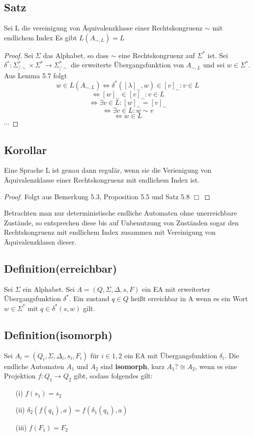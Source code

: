 \subsection{Satz} Sei L die vereinigung von Äquivalenzklasse einer Rechtskongruenz $\sim$ mit endlichem Index Es gibt $L(A_{\sim, L}) = L$ 
\begin{proof}
  Sei $\Sigma$ das Alphabet, so dass $\sim$ eine Rechtskongruenz auf $\Sigma^{*}$ ist. Sei $\delta^{*} : \Sigma^{*}_{/\sim} \times \Sigma^{*} \rightarrow \Sigma^{*}_{/\sim}$ die erweiterte Übergangsfunktion von $A_{\sim, L}$ und sei $w \in \Sigma^{*}$. Aus Lemma 5.7 folgt 
  \[w \in L(A_{\sim, L}) \Leftrightarrow \delta^{*}([\lambda]_{\sim}, w) \in {[v]_{\sim} : v \in L}\]
  \[\Leftrightarrow [w]_{\sim} \in {[v]_{\sim} : v\in L}\]
  \[\Leftrightarrow \exists v \in L : [w]_{\sim} = [v]_{\sim}\]
  \[\Leftrightarrow \exists v \in L : w \sim v\]
  \[\Leftrightarrow w \in L\]
  $\cdots$    
\end{proof}

\subsection{Korollar} Eine Sprache L ist genau dann regulär, wenn sie die Verienigung von Äquivalenzklasse einer Rechtskongruenz mit endlichem Index ist. 
\begin{proof}
  Folgt aus Bemerkung 5.3, Proposition 5.5 und Satz 5.8 $\Box$ 
\end{proof}
Betrachten man nur deterministische endliche Automaten ohne unerreichbare Zustände, so entsprechen diese bis auf Unbenutzung von Zuständen sogar den Rechtskongruenz mit endlichem Index zusammen mit Vereinigung von Äquivalenzklassn dieser.

\subsection{Definition(erreichbar)} Sei $\Sigma$ ein Alphabet. Sei $A = (Q, \Sigma, \Delta, s, F)$ ein EA mit erweiterter Übergangsfunktion $\delta^{*}$. Ein zustand $q\in Q$ heißt erreichbar in A wenn es ein Wort $w \in \Sigma ^{*}$ mit $q\in \delta^{*}(s, w)$ gilt.

\subsection{Definition(isomorph)} Sei $A_{i} = (Q_{i}, \Sigma, \Delta_{i}, s_{i}, F_{i})$ für $i \in {1,2}$ ein EA mit Übergangsfunktion $\delta_{i}$. Die endliche Automaten $A_{1}$ und $A_{2}$ sind \textbf{isomorph}, kurz $A_{1}? \cong A_{2}$, wenn es eine Projektion $f:Q_{1}\rightarrow Q_{2}$ gibt, sodass folgendes gilt:
\begin{itemize}
    \item [(i)] $f(s_{1}) = s_{2}$
    \item [(ii)] $\delta_{2}(f(q_{1}), a) = f(\delta_{1}(q_{1}), a)$
    \item [(iii)] $f(F_1) = F_2$
\end{itemize}


